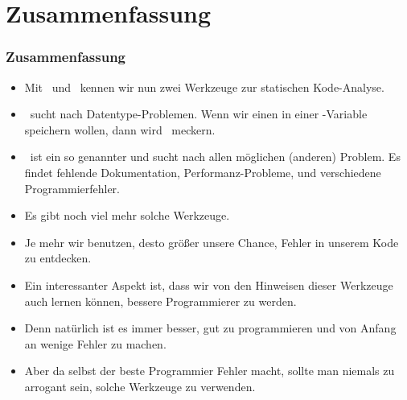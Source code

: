 \documentclass[aspectratio=169,mathserif,notheorems]{beamer}%
\begin{document}
\section{Zusammenfassung}%
%
\begin{frame}%
\frametitle{Zusammenfassung}%
\begin{itemize}%
\item Mit \ruff\ und \mypy\ kennen wir nun zwei Werkzeuge zur statischen Kode-Analyse.%
%
\item<2-> \mypy\ sucht nach Datentype-Problemen. Wenn wir einen  in einer -Variable speichern wollen, dann wird \mypy\ meckern.%
%
\item<3-> \ruff\ ist ein so genannter  und sucht nach allen möglichen (anderen) Problem. Es findet fehlende Dokumentation, Performanz-Probleme, und verschiedene Programmierfehler.%
%
\item<4-> Es gibt noch viel mehr solche Werkzeuge.%
%
\item<5-> Je mehr wir benutzen, desto größer unsere Chance, Fehler in unserem Kode zu entdecken.%
%
\item<6-> Ein interessanter Aspekt ist, dass wir von den Hinweisen dieser Werkzeuge auch lernen können, bessere Programmierer zu werden.%
%
\item<7-> Denn natürlich ist es immer besser, gut zu programmieren und von Anfang an wenige Fehler zu machen.%
%
\item<8-> Aber da selbst der beste Programmier Fehler macht, sollte man niemals zu arrogant sein, solche Werkzeuge zu verwenden.%
%
\end{itemize}%
\end{frame}%
%
\endPresentation%
\end{document}
